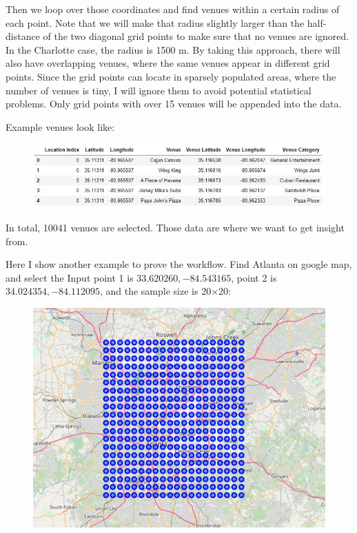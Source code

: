 \documentclass{article}
\begin{document}
Then we loop over those coordinates and find venues within a certain radius of each point. Note that we will make that radius slightly larger than the half-distance of the two diagonal grid points to make sure that no venues are ignored.
In the Charlotte case, the radius is 1500 m.
By taking this approach, there will also have overlapping venues, where the same venues appear in different grid points.
Since the grid points can locate in sparsely populated areas, where the number of venues is tiny, I will ignore them to avoid potential statistical problems. Only grid points with over 15 venues will be appended into the data.

Example venues look like:
\begin{figure}[h!]
\includegraphics[width=1.0\textwidth]{c4.jpg}
\centering
\end{figure}

In total, 10041 venues are selected. Those data are where we want to get insight from.

Here I show another example to prove the workflow.
Find Atlanta on google map, and select the 
Input point 1 is $33.620260, -84.543165$, point 2 is $34.024354, -84.112095$, and the sample size is 20$\times$20:
\begin{figure}[h!]
\includegraphics[width=1.0\textwidth]{c5.jpg}
\centering
\end{figure}
\end{document}
